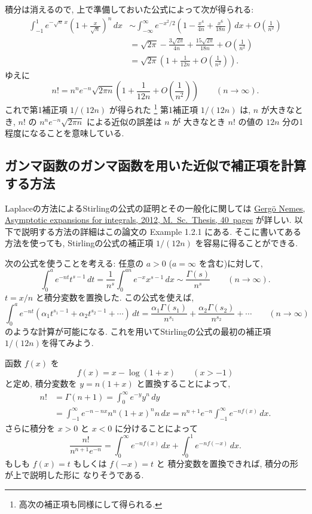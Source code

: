 \documentclass[12pt,twoside]{jarticle}
\theoremstyle{jplain}
\theoremstyle{jplain}
\theoremstyle{jplain}
\numberwithin{theorem}{section}
\numberwithin{equation}{section}
\numberwithin{figure}{section}
\numberwithin{table}{section}
\begin{document}
積分は消えるので, 上で準備しておいた公式によって次が得られる:
\begin{align*}
\int_{-1}^1
e^{-\sqrt{n}\,x} \left( 1+\frac{x}{\sqrt{n}} \right)^n\,dx
& \sim
\int_{-\infty}^{\infty}
e^{-x^2/2}
\left(
 1
 -\frac{x^4}{4n}
 +\frac{x^6}{18n}
\right)
\,dx
+O\left( \frac{1}{n^2} \right)
\\ &
=
\sqrt{2\pi}
-\frac{3\sqrt{2\pi}}{4n}
+\frac{15\sqrt{2\pi}}{18n}
+O\left( \frac{1}{n^2} \right)
\\ &
=\sqrt{2\pi}\left(1 + \frac{1}{12n} + O\left(\frac{1}{n^2}\right) \right).
\end{align*}
ゆえに
\[
n! 
=
n^n e^{-n}\sqrt{2\pi n}
\left(1+\frac{1}{12n}+O\left(\frac{1}{n^2}\right)\right)
\qquad(n\to\infty).
\]
これで第1補正項 $1/(12n)$ が得られた%
\footnote{高次の補正項も同様にして得られる.}
第1補正項 $1/(12n)$ は, $n$ が大きなとき, 
$n!$ の $n^n e^{-n}\sqrt{2\pi n}$ による近似の誤差は $n$ が
大きなとき $n!$ の値の $12n$ 分の1程度になることを意味している.


\subsection{ガンマ函数のガンマ函数を用いた近似で補正項を計算する方法}

Laplaceの方法によるStirlingの公式の証明とその一般化に関しては
\href{https://www.cs.elte.hu/blobs/diplomamunkak/msc_mat/2012/nemes_gergo.pdf}
{Gerg\"o Nemes, Asymptotic expansions for integrals, 2012, M.~Sc.~Thesis, 40~pages}
が詳しい. 以下で説明する方法の詳細はこの論文の Example 1.2.1 にある.
そこに書いてある方法を使っても, 
Stirlingの公式の補正項 $1/(12n)$ を容易に得ることができる.

次の公式を使うことを考える: 任意の $a>0$ ($a=\infty$ を含む)に対して, 
\[
\int_0^a e^{-nt} t^{s-1}\,dt 
= \frac{1}{n^s}\int_0^{an} e^{-x} x^{s-1}\,dx
\sim
\frac{\Gamma(s)}{n^s}
\qquad (n\to\infty).
\]
$t=x/n$ と積分変数を置換した. この公式を使えば, 
\[
\int_0^a e^{-nt} (\alpha_1 t^{s_1-1} + \alpha_2 t^{s_2-1} + \cdots)\,dt
=
\frac{\alpha_1\Gamma(s_1)}{n^{s_1}} + \frac{\alpha_2\Gamma(s_2)}{n^{s_2}} + \cdots
\qquad (n\to\infty)
\]
のような計算が可能になる.
これを用いてStirlingの公式の最初の補正項 $1/(12n)$を得てみよう.

函数 $f(x)$ を
\[
f(x) = x-\log(1+x) \qquad (x>-1)
\]
と定め, 積分変数を $y=n(1+x)$ と置換することによって,
\begin{align*}
n! 
&= \Gamma(n+1) 
= \int_0^\infty e^{-y} y^n\,dy
\\ &
= \int_{-1}^\infty e^{-n-nx}n^n(1+x)^n n\,dx
= n^{n+1}e^{-n}\int_{-1}^\infty e^{-nf(x)}\,dx.
\end{align*}
さらに積分を $x>0$ と $x<0$ に分けることによって
\[
\frac{n!}{n^{n+1}e^{-n}}
= \int_0^\infty e^{-nf(x)}\,dx + \int_0^1 e^{-nf(-x)}\,dx.
\]
もしも $f(x)=t$ もしくは $f(-x)=t$ と
積分変数を置換できれば, 積分の形が上で説明した形に
なりそうである.
\end{document}
